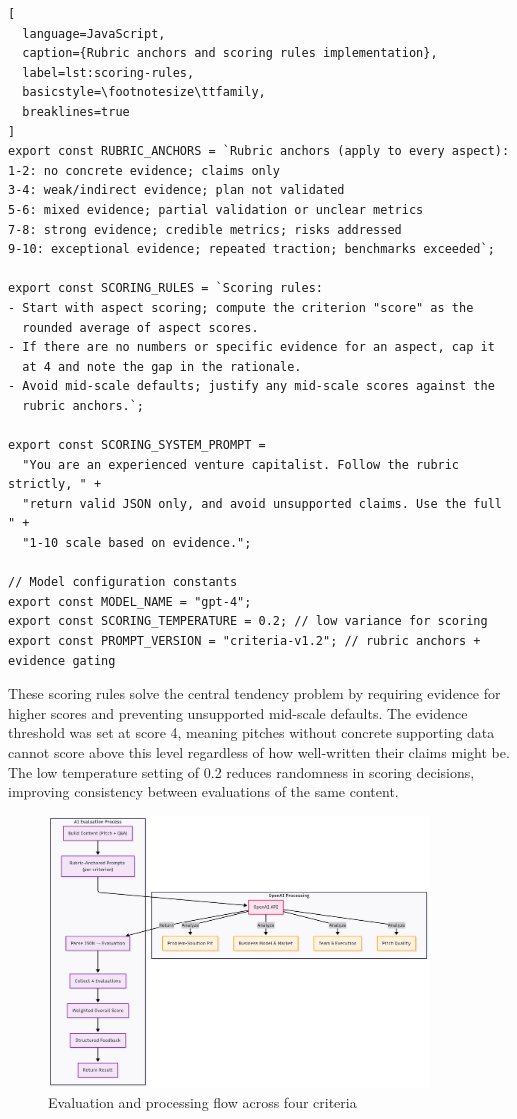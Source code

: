 \begin{lstlisting}[
  language=JavaScript,
  caption={Rubric anchors and scoring rules implementation},
  label=lst:scoring-rules,
  basicstyle=\footnotesize\ttfamily,
  breaklines=true
]
export const RUBRIC_ANCHORS = `Rubric anchors (apply to every aspect):
1-2: no concrete evidence; claims only
3-4: weak/indirect evidence; plan not validated
5-6: mixed evidence; partial validation or unclear metrics
7-8: strong evidence; credible metrics; risks addressed
9-10: exceptional evidence; repeated traction; benchmarks exceeded`;

export const SCORING_RULES = `Scoring rules:
- Start with aspect scoring; compute the criterion "score" as the 
  rounded average of aspect scores.
- If there are no numbers or specific evidence for an aspect, cap it 
  at 4 and note the gap in the rationale.
- Avoid mid-scale defaults; justify any mid-scale scores against the 
  rubric anchors.`;

export const SCORING_SYSTEM_PROMPT = 
  "You are an experienced venture capitalist. Follow the rubric strictly, " +
  "return valid JSON only, and avoid unsupported claims. Use the full " +
  "1-10 scale based on evidence.";

// Model configuration constants
export const MODEL_NAME = "gpt-4";
export const SCORING_TEMPERATURE = 0.2; // low variance for scoring
export const PROMPT_VERSION = "criteria-v1.2"; // rubric anchors + evidence gating
\end{lstlisting}

These scoring rules solve the central tendency problem by requiring evidence for higher scores and preventing unsupported mid-scale defaults. The evidence threshold was set at score 4, meaning pitches without concrete supporting data cannot score above this level regardless of how well-written their claims might be. The low temperature setting of 0.2 reduces randomness in scoring decisions, improving consistency between evaluations of the same content.

\begin{figure}[H]
  \centering
  \includegraphics[width=0.9\textwidth]{img/eval-flow}
\caption{Evaluation and processing flow across four criteria}
  \label{fig:eval-flow}
\end{figure}

